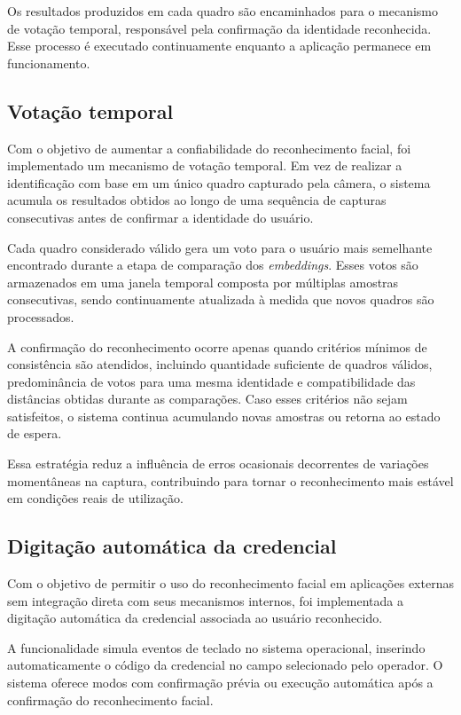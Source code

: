 Os resultados produzidos em cada quadro são encaminhados para o mecanismo de votação temporal, responsável pela confirmação da identidade reconhecida. Esse processo é executado continuamente enquanto a aplicação permanece em funcionamento.

\subsection{Votação temporal}

Com o objetivo de aumentar a confiabilidade do reconhecimento facial, foi implementado um mecanismo de votação temporal. Em vez de realizar a identificação com base em um único quadro capturado pela câmera, o sistema acumula os resultados obtidos ao longo de uma sequência de capturas consecutivas antes de confirmar a identidade do usuário.

Cada quadro considerado válido gera um voto para o usuário mais semelhante encontrado durante a etapa de comparação dos \textit{embeddings}. Esses votos são armazenados em uma janela temporal composta por múltiplas amostras consecutivas, sendo continuamente atualizada à medida que novos quadros são processados.

A confirmação do reconhecimento ocorre apenas quando critérios mínimos de consistência são atendidos, incluindo quantidade suficiente de quadros válidos, predominância de votos para uma mesma identidade e compatibilidade das distâncias obtidas durante as comparações. Caso esses critérios não sejam satisfeitos, o sistema continua acumulando novas amostras ou retorna ao estado de espera.

Essa estratégia reduz a influência de erros ocasionais decorrentes de variações momentâneas na captura, contribuindo para tornar o reconhecimento mais estável em condições reais de utilização.


\subsection{Digitação automática da credencial}

Com o objetivo de permitir o uso do reconhecimento facial em aplicações externas sem integração direta com seus mecanismos internos, foi implementada a digitação automática da credencial associada ao usuário reconhecido.

A funcionalidade simula eventos de teclado no sistema operacional, inserindo automaticamente o código da credencial no campo selecionado pelo operador. O sistema oferece modos com confirmação prévia ou execução automática após a confirmação do reconhecimento facial.


